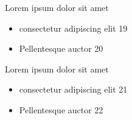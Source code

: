 \documentclass{beamer}
\begin{document}
\begin{frame}{Lorem ipsum dolor sit amet}
\begin{itemize}
\item consectetur adipiscing elit 19
\item Pellentesque auctor 20
\end{itemize}
\end{frame}


\begin{frame}{Lorem ipsum dolor sit amet}
\begin{itemize}
\item consectetur adipiscing elit 21
\item Pellentesque auctor 22
\end{itemize}
\end{frame}
\end{document}

